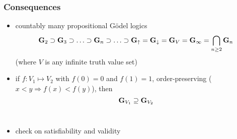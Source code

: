 \documentclass[aspectratio=169]%
  {beamer}
\newcommand{\cC}{\mathcal{C}}
\newcommand{\vup}{{\uparrow}}
\newcommand{\vdn}{{\downarrow}}
\newcommand{\limp}{\supset}
\newcommand{\gdl}[1]{{\bf G}_{#1}}
\newcommand{\sis}{\\[\medskipamount]}
\begin{document}
    

    






\begin{frame}
  \frametitle{Consequences}
  \begin{itemize}
  \item countably many propositional Gödel logics
   \[ 
     \gdl{2} \supset \gdl{3} \supset \ldots \supset \gdl n \supset \ldots
     \supset \gdl\vup = \gdl\vdn = \gdl V = \gdl\infty = \bigcap_{n\ge 2} \gdl n
   \]
   (where $V$ is any infinite truth value set)\sis
  \item if $f: V_1 \mapsto V_2$ with $f(0) = 0$ and $f(1) = 1$, order-preserving
    ($x<y \Rightarrow f(x) < f(y)$), then
    \[ \gdl{V_1} \supseteq \gdl{V_2} \]\sis
  \item check on satisfiability and validity
  \end{itemize}
\end{frame}
\end{document}

